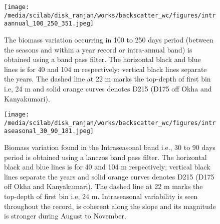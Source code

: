 \documentclass{article}
\begin{document}
\begin{figure}[htbp]
	\centering
	\texttt{[image: /media/scilab/disk\_ranjan/works/backscatter\_wc/figures/intraannual\_100\_250\_351.jpeg]} 
	\captionsetup{justification=justified,font=footnotesize,skip=0.05\baselineskip,width=\textwidth}
	\caption{The biomass variation occurring in 100 to 250 days period (between the seasons and within a year record or intra-annual band) is obtained using a band pass filter. The horizontal black and blue lines is for 40 and 104 m respectively; vertical black lines separate the years. The dashed line at 22 m marks the top-depth of first bin i.e, 24 m and solid orange curves denotes D215 (D175 off Okha and Kanyakumari). }
	\label{fig:intraannual}
\end{figure}

\begin{figure}[htbp]
	\centering
	\texttt{[image: /media/scilab/disk\_ranjan/works/backscatter\_wc/figures/intraseasonal\_30\_90\_181.jpeg]} 
	\captionsetup{justification=justified,font=footnotesize,skip=0.05\baselineskip,width=\textwidth}
	\caption{Biomass variation found in the Intraseasonal band i.e., 30 to 90 days  period is obtained using a lanczos band pass filter. The horizontal black and blue lines is for 40 and 104 m respectively; vertical black lines separate the years and solid orange curves denotes D215 (D175 off Okha and Kanyakumari). The dashed line at 22 m marks the top-depth of first bin i.e, 24 m. Intraseasonal variability is seen throughout the record, is coherent along the slope and its magnitude is stronger during August to November.}
	\label{fig:intraseasonal}
\end{figure}
\end{document}
